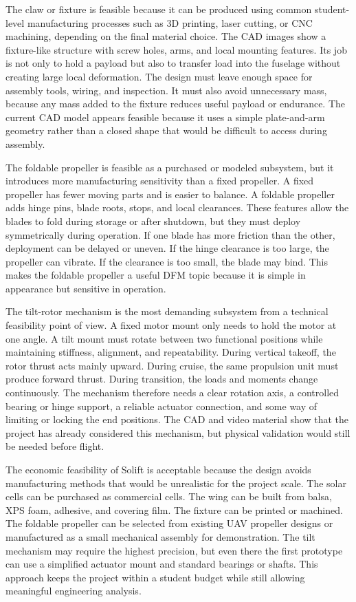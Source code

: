 The claw or fixture is feasible because it can be produced using common student-level manufacturing processes such as 3D printing, laser cutting, or CNC machining, depending on the final material choice. The CAD images show a fixture-like structure with screw holes, arms, and local mounting features. Its job is not only to hold a payload but also to transfer load into the fuselage without creating large local deformation. The design must leave enough space for assembly tools, wiring, and inspection. It must also avoid unnecessary mass, because any mass added to the fixture reduces useful payload or endurance. The current CAD model appears feasible because it uses a simple plate-and-arm geometry rather than a closed shape that would be difficult to access during assembly.

The foldable propeller is feasible as a purchased or modeled subsystem, but it introduces more manufacturing sensitivity than a fixed propeller. A fixed propeller has fewer moving parts and is easier to balance. A foldable propeller adds hinge pins, blade roots, stops, and local clearances. These features allow the blades to fold during storage or after shutdown, but they must deploy symmetrically during operation. If one blade has more friction than the other, deployment can be delayed or uneven. If the hinge clearance is too large, the propeller can vibrate. If the clearance is too small, the blade may bind. This makes the foldable propeller a useful DFM topic because it is simple in appearance but sensitive in operation.

The tilt-rotor mechanism is the most demanding subsystem from a technical feasibility point of view. A fixed motor mount only needs to hold the motor at one angle. A tilt mount must rotate between two functional positions while maintaining stiffness, alignment, and repeatability. During vertical takeoff, the rotor thrust acts mainly upward. During cruise, the same propulsion unit must produce forward thrust. During transition, the loads and moments change continuously. The mechanism therefore needs a clear rotation axis, a controlled bearing or hinge support, a reliable actuator connection, and some way of limiting or locking the end positions. The CAD and video material show that the project has already considered this mechanism, but physical validation would still be needed before flight.

The economic feasibility of Solift is acceptable because the design avoids manufacturing methods that would be unrealistic for the project scale. The solar cells can be purchased as commercial cells. The wing can be built from balsa, XPS foam, adhesive, and covering film. The fixture can be printed or machined. The foldable propeller can be selected from existing UAV propeller designs or manufactured as a small mechanical assembly for demonstration. The tilt mechanism may require the highest precision, but even there the first prototype can use a simplified actuator mount and standard bearings or shafts. This approach keeps the project within a student budget while still allowing meaningful engineering analysis.

